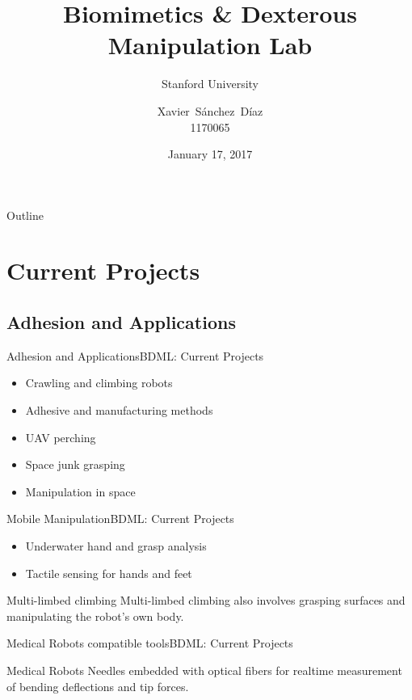 \documentclass{beamer}
\title{Biomimetics \& Dexterous Manipulation Lab}
\subtitle{Stanford University}
\author[X. S\'{a}nchez]{Xavier~S\'{a}nchez~D\'{i}az \\ 1170065}
\institute[ITESM] %
{
Robotics
}
\date{January 17, 2017}
\begin{document}
\begin{frame}
\titlepage
\end{frame}



\begin{frame}[allowframebreaks=1]{Outline}
\tableofcontents[hideallsubsections=true]
\end{frame}



\section{Current Projects}

\subsection{Adhesion and Applications}

\begin{frame}{Adhesion and Applications}{BDML: Current Projects}

\begin{itemize}
  \item Crawling and climbing robots
  \item Adhesive and manufacturing methods
  \item UAV perching
  \item Space junk grasping
  \item Manipulation in space
\end{itemize}
\end{frame}

\begin{frame}{Mobile Manipulation}{BDML: Current Projects}
\begin{itemize}
  \item Underwater hand and grasp analysis
  \item Tactile sensing for hands and feet
\end{itemize}
\vspace{3ex}
\begin{block}{Multi-limbed climbing}
Multi-limbed climbing also involves grasping surfaces and manipulating the robot's own body.
\end{block}
\end{frame}

\begin{frame}{Medical Robots compatible tools}{BDML: Current Projects}
\begin{block}{Medical Robots}
Needles embedded with optical fibers for realtime measurement of bending deflections and tip forces.
\end{block}
\end{frame}
\end{document}
